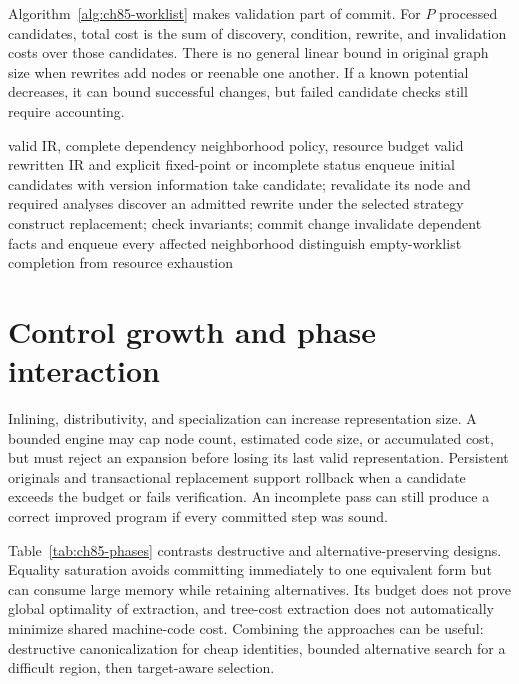 Algorithm~\ref{alg:ch85-worklist} makes validation part of commit.
For $P$ processed candidates, total cost is the sum of discovery, condition, rewrite, and invalidation costs over those candidates.
There is no general linear bound in original graph size when rewrites add nodes or reenable one another.
If a known potential decreases, it can bound successful changes, but failed candidate checks still require accounting.

\begin{algorithm}[htbp]
\caption{Run an affected-node rewrite worklist with stale-match protection.}
\label{alg:ch85-worklist}
\begin{pseudocode}
\Require valid IR, complete dependency neighborhood policy, resource budget
\Ensure valid rewritten IR and explicit fixed-point or incomplete status
\State enqueue initial candidates with version information
\State take candidate; revalidate its node and required analyses
\State discover an admitted rewrite under the selected strategy
\State construct replacement; check invariants; commit change
\State invalidate dependent facts and enqueue every affected neighborhood
\EndIf
\EndWhile
\State distinguish empty-worklist completion from resource exhaustion
\end{pseudocode}
\end{algorithm}

\section{Control growth and phase interaction}
\label{sec:ch85-growth}
Inlining, distributivity, and specialization can increase representation size.
A bounded engine may cap node count, estimated code size, or accumulated cost, but must reject an expansion before losing its last valid representation.
Persistent originals and transactional replacement support rollback when a candidate exceeds the budget or fails verification.
An incomplete pass can still produce a correct improved program if every committed step was sound.

Table~\ref{tab:ch85-phases} contrasts destructive and alternative-preserving designs.
Equality saturation avoids committing immediately to one equivalent form but can consume large memory while retaining alternatives.
Its budget does not prove global optimality of extraction, and tree-cost extraction does not automatically minimize shared machine-code cost.
Combining the approaches can be useful: destructive canonicalization for cheap identities, bounded alternative search for a difficult region, then target-aware selection.

